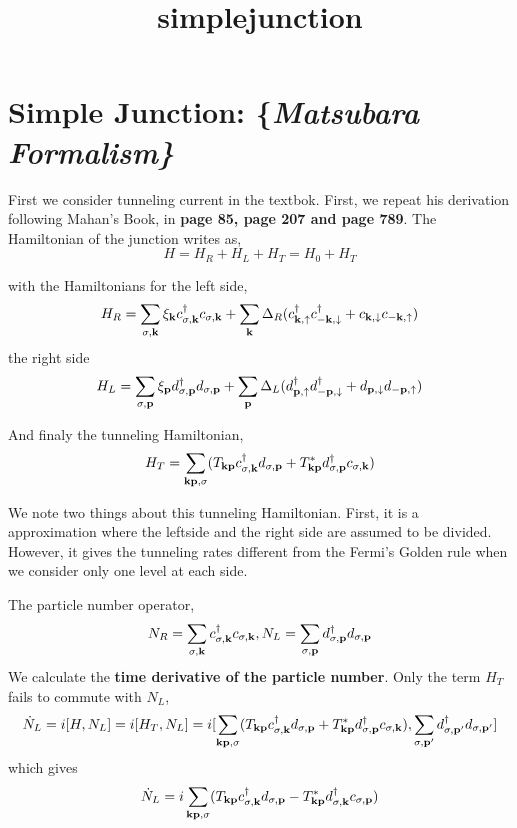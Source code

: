 \documentclass[11pt]{article}
\title{simplejunction}
\begin{document}
    
    
    \maketitle
    
    

    
    \hypertarget{simple-junction}{%
\section{\texorpdfstring{Simple Junction:
\{\it Matsubara Formalism\}}{Simple Junction: \{\}}}\label{simple-junction}}

    First we consider tunneling current in the textbok. First, we repeat his
derivation following Mahan's Book, in \textbf{page 85, page 207 and page
789}. The Hamiltonian of the junction writes as, \[
H=H_{R}+H_L+H_T=H_0+H_T
\]

    with the Hamiltonians for the left side, \[
H_R =\sum_{\sigma,{\bf k}} \xi_{\bf k} c^{\dagger}_{\sigma,{\bf
k}}c_{\sigma,{\bf k}}+\sum_{{\bf k}} \Delta_R ( c^{\dagger}_{{\bf
k},\uparrow}c^{\dagger}_{{\bf -k},\downarrow}+ c_{{\bf
k},\downarrow} c_{{\bf -k},\uparrow})
\] the right side \[
H_L=\sum_{\sigma,{\bf p}}\xi_{\bf p} d^{\dagger}_{\sigma,{\bf
p}}d_{\sigma,{\bf p}}+\sum_{{\bf p}}
\Delta_L (d^{\dagger}_{{\bf p},\uparrow}d^{\dagger}_{{\bf -p},\downarrow} + d_{{\bf p},\downarrow}d_{{\bf -p},\uparrow})
\]

    And finaly the tunneling Hamiltonian, \[
H_T=\sum_{{\bf k}{\bf p},\sigma}(T_{{\bf k}{\bf
p}}c^{\dagger}_{\sigma,{\bf k}}d_{\sigma,{\bf p}}+T^*_{{\bf k}{\bf
p}}d^{\dagger}_{\sigma,{\bf p}}c_{\sigma,{\bf k}})
\]

We note two things about this tunneling Hamiltonian. First, it is a
approximation where the leftside and the right side are assumed to be
divided. However, it gives the tunneling rates different from the
Fermi's Golden rule when we consider only one level at each side.

    The particle number operator, \[
N_R=\sum_{\sigma,{\bf k}}
c^{\dagger}_{\sigma,{\bf k}}c_{\sigma,{\bf k}},
N_L=\sum_{\sigma,{\bf p}} d^{\dagger}_{\sigma,{\bf p}}d_{\sigma,{\bf
p}}
\] We calculate the \textbf{time derivative of the particle number}.
Only the term \(H_T\) fails to commute with \(N_L\), \[
\dot N_L=i[H,N_L]=i[H_T,N_L] 
=i[\sum_{{\bf k}{\bf p},\sigma}(T_{{\bf
k}{\bf p}}c^{\dagger}_{\sigma,{\bf k}}d_{\sigma,{\bf p}}+T^*_{{\bf
k}{\bf p}}d^{\dagger}_{\sigma,{\bf p}}c_{\sigma,{\bf
k}}),\sum_{\sigma,{\bf p'}} d^{\dagger}_{\sigma,{\bf
p'}}d_{\sigma,{\bf p'}}]
\] which gives \[
\dot N_L= i\sum_{{\bf k}{\bf p},\sigma}(T_{{\bf
k}{\bf p}}c^{\dagger}_{\sigma,{\bf k}}d_{\sigma,{\bf p}}-T^*_{{\bf
k}{\bf p}}d^{\dagger}_{\sigma,{\bf k}}c_{\sigma,{\bf p}})
\]
\end{document}
